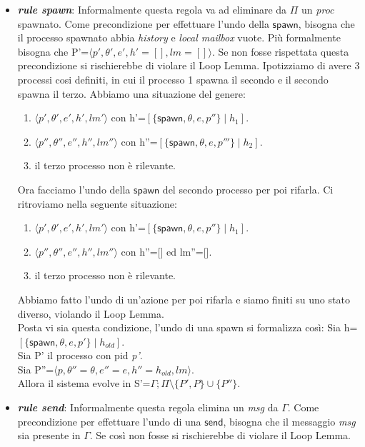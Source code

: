 \documentclass[background.tex]{subfiles}
\begin{document}
	\begin{itemize}
		\item \textit{\textbf{rule spawn}}: Informalmente questa regola va ad eliminare da $\Pi$ un \textit{proc} spawnato. Come precondizione per effettuare l'undo della $\mathsf{spawn}$, bisogna che il processo spawnato abbia \textit{history} e \textit{local mailbox} vuote. Più formalmente bisogna che P'=$\displaystyle \langle p',\theta',e',h'=[],lm=[]\rangle$. Se non fosse rispettata questa precondizione si rischierebbe di violare il Loop Lemma.
		Ipotizziamo di avere 3 processi cosi definiti, in cui il processo 1 spawna il secondo e il secondo spawna il terzo.
		Abbiamo una situazione del genere:
		\begin{enumerate}
			\item $\displaystyle \langle p',\theta',e',h',lm' \rangle$ con h'=$\displaystyle [\{\mathsf{spawn},\theta,e,p''\} \mid h_{1}]$.
			\item  $\displaystyle \langle p'',\theta'',e'',h'',lm''\rangle$ con h''=$\displaystyle[\{\mathsf{spawn},\theta,e,p'''\} \mid h_{2}]$.
			\item il terzo processo non è rilevante.
		\end{enumerate}
		Ora facciamo l'undo della $\mathsf{spawn}$ del secondo processo per poi rifarla.
		Ci ritroviamo nella seguente situazione:
			\begin{enumerate}
			\item $\displaystyle \langle p',\theta',e',h',lm' \rangle$ con h'=$\displaystyle [\{\mathsf{spawn},\theta,e,p''\} \mid h_{1}]$.
			\item $\displaystyle \langle p'',\theta'',e'',h'',lm'' \rangle$ con h''=[] ed lm''=[].
			\item il terzo processo non è rilevante.
		\end{enumerate}
		Abbiamo fatto l'undo di un'azione per poi rifarla e siamo finiti su uno stato diverso, violando il Loop Lemma.\\
		Posta vi sia questa condizione, l'undo di una spawn si formalizza così:
		Sia h=$\displaystyle [\{\mathsf{spawn},\theta,e,p'\} \mid h_{old}]$.\\
		Sia P' il processo con pid \textit{p'}.\\
		Sia P''=$\displaystyle \langle p,\theta'' = \theta,e''=e,h''=h_{old},lm \rangle$.\\
		Allora il sistema evolve in S'=$\displaystyle \Gamma;\Pi\setminus\{P',P\}\cup\{P''\}$.
		\item \textit{\textbf{rule send}}: Informalmente questa regola elimina un \textit{msg} da $\Gamma$. Come precondizione per effettuare l'undo di una $\mathsf{send}$, bisogna che il messaggio \textit{msg} sia presente in $\Gamma$. Se così non fosse si rischierebbe di violare il Loop Lemma.

\end{itemize}
\end{document}
